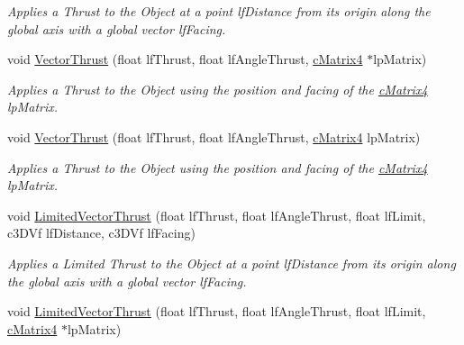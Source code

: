 \begin{DoxyCompactItemize}
\begin{DoxyCompactList}\small\item\em Applies a Thrust to the Object at a point lfDistance from its origin along the global axis with a global vector lfFacing. \end{DoxyCompactList}\item 
\hypertarget{classc_momentum_a129836338add9a05e54cee757ab38c17}{
void \hyperlink{classc_momentum_a129836338add9a05e54cee757ab38c17}{VectorThrust} (float lfThrust, float lfAngleThrust, \hyperlink{classc_matrix4}{cMatrix4} $\ast$lpMatrix)}
\label{classc_momentum_a129836338add9a05e54cee757ab38c17}

\begin{DoxyCompactList}\small\item\em Applies a Thrust to the Object using the position and facing of the \hyperlink{classc_matrix4}{cMatrix4} lpMatrix. \end{DoxyCompactList}\item 
\hypertarget{classc_momentum_ad16806d92816dd5e2746228ab801f96a}{
void \hyperlink{classc_momentum_ad16806d92816dd5e2746228ab801f96a}{VectorThrust} (float lfThrust, float lfAngleThrust, \hyperlink{classc_matrix4}{cMatrix4} lpMatrix)}
\label{classc_momentum_ad16806d92816dd5e2746228ab801f96a}

\begin{DoxyCompactList}\small\item\em Applies a Thrust to the Object using the position and facing of the \hyperlink{classc_matrix4}{cMatrix4} lpMatrix. \end{DoxyCompactList}\item 
\hypertarget{classc_momentum_a757bf4b32f53f2985a2a9ba59c3be3b9}{
void \hyperlink{classc_momentum_a757bf4b32f53f2985a2a9ba59c3be3b9}{LimitedVectorThrust} (float lfThrust, float lfAngleThrust, float lfLimit, c3DVf lfDistance, c3DVf lfFacing)}
\label{classc_momentum_a757bf4b32f53f2985a2a9ba59c3be3b9}

\begin{DoxyCompactList}\small\item\em Applies a Limited Thrust to the Object at a point lfDistance from its origin along the global axis with a global vector lfFacing. \end{DoxyCompactList}\item 
\hypertarget{classc_momentum_a2f47d7a52c895ea2fbcdc24ebf1fb199}{
void \hyperlink{classc_momentum_a2f47d7a52c895ea2fbcdc24ebf1fb199}{LimitedVectorThrust} (float lfThrust, float lfAngleThrust, float lfLimit, \hyperlink{classc_matrix4}{cMatrix4} $\ast$lpMatrix)}
\label{classc_momentum_a2f47d7a52c895ea2fbcdc24ebf1fb199}


\end{DoxyCompactItemize}
